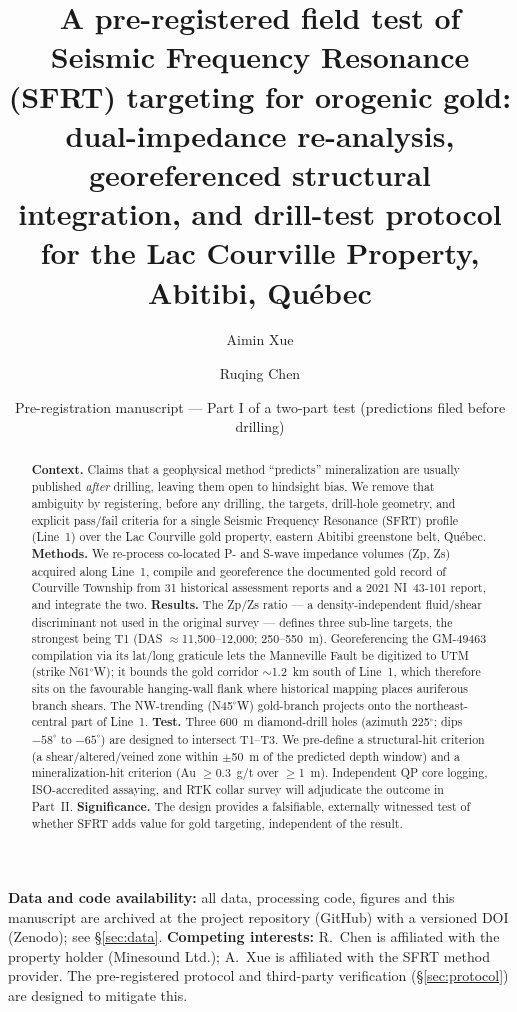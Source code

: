 \documentclass[11pt]{article}
\title{\bfseries A pre-registered field test of Seismic Frequency Resonance (SFRT)
targeting for orogenic gold: dual-impedance re-analysis, georeferenced structural
integration, and drill-test protocol for the Lac Courville Property, Abitibi, Qu\'ebec}
\author[1]{Aimin Xue}
\author[2]{Ruqing Chen}
\affil[1]{Beijing Petrosound Geoservices Corp., Beijing, China. \texttt{aiminx@126.com}}
\affil[2]{Minesound Ltd., Montreal, Canada. \texttt{ruqing@hotmail.com}}
\date{Pre-registration manuscript --- Part I of a two-part test (predictions filed before drilling)}
\begin{document}
\maketitle

\begin{abstract}
\noindent\textbf{Context.} Claims that a geophysical method ``predicts'' mineralization are
usually published \emph{after} drilling, leaving them open to hindsight bias. We remove that
ambiguity by registering, before any drilling, the targets, drill-hole geometry, and explicit
pass/fail criteria for a single Seismic Frequency Resonance (SFRT) profile (Line~1) over the
Lac Courville gold property, eastern Abitibi greenstone belt, Qu\'ebec.
\textbf{Methods.} We re-process co-located P- and S-wave impedance volumes (Zp, Zs) acquired
along Line~1, compile and georeference the documented gold record of Courville Township from
31 historical assessment reports and a 2021 NI~43-101 report, and integrate the two.
\textbf{Results.} The Zp/Zs ratio --- a density-independent fluid/shear discriminant not used
in the original survey --- defines three sub-line targets, the strongest being T1 (DAS
$\approx$11,500--12,000; 250--550~m). Georeferencing the GM-49463 compilation via its lat/long
graticule lets the Manneville Fault be digitized to UTM (strike N61$^\circ$W); it bounds the
gold corridor $\sim$1.2~km south of Line~1, which therefore sits on the favourable
hanging-wall flank where historical mapping places auriferous branch shears. The NW-trending
(N45$^\circ$W) gold-branch projects onto the northeast-central part of Line~1.
\textbf{Test.} Three 600~m diamond-drill holes (azimuth 225$^\circ$; dips $-58^\circ$ to
$-65^\circ$) are designed to intersect T1--T3. We pre-define a structural-hit criterion
(a shear/altered/veined zone within $\pm$50~m of the predicted depth window) and a
mineralization-hit criterion (Au $\ge$0.3~g/t over $\ge$1~m). Independent QP core logging,
ISO-accredited assaying, and RTK collar survey will adjudicate the outcome in Part~II.
\textbf{Significance.} The design provides a falsifiable, externally witnessed test of whether
SFRT adds value for gold targeting, independent of the result.
\end{abstract}

\textbf{Data and code availability:} all data, processing code, figures and this manuscript
are archived at the project repository (GitHub) with a versioned DOI (Zenodo); see
\S\ref{sec:data}. \textbf{Competing interests:} R.~Chen is affiliated with the property holder
(Minesound Ltd.); A.~Xue is affiliated with the SFRT method provider. The pre-registered
protocol and third-party verification (\S\ref{sec:protocol}) are designed to mitigate this.
\end{document}

